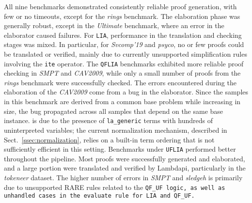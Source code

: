 All nine benchmarks demonstrated consistently reliable proof generation, with few or no timeouts, except for the \emph{rings} benchmark.
The elaboration phase was generally robust, except in the \emph{Ultimate} benchmark, where an error in the elaborator caused failures.
For \texttt{LIA}, performance in the translation and checking stages was mixed. In particular, for \emph{Svcomp'19} and \emph{psyco}, no or few proofs could be translated or verified, mainly due to currently unsupported simplification rules involving the \texttt{ite} operator.
The \texttt{QFLIA} benchmarks exhibited more reliable proof checking in \emph{SMPT} and \emph{CAV2009}, while only a small number of proofs from the \emph{rings} benchmark were successfully checked.
The errors encountered during the elaboration of the \emph{CAV2009} come from a bug in the elaborator. Since the samples in this benchmark are derived from a common base problem while increasing in size, the bug propagated across all samples that depend on the same base instance.
 is due to the presence of \texttt{la\_generic} terms with hundreds of uninterpreted variables; the current normalization mechanism, described in Sect.~\ref{ssec:normalization}, relies on a built-in term ordering that is not sufficiently efficient in this setting.
Benchmarks under \texttt{UFLIA} performed better throughout the pipeline. Most proofs were successfully generated and elaborated, and a large portion were translated and verified by Lambdapi, particularly in the \emph{tokeneer} dataset.
The higher number of errors in \emph{SMPT} and \emph{sledgeh} is primarily due to unsupported RARE rules related to the \tt{QF\_UF} logic, as well as unhandled cases in the \texttt{evaluate} rule for \texttt{LIA} and \texttt{QF\_UF}.

